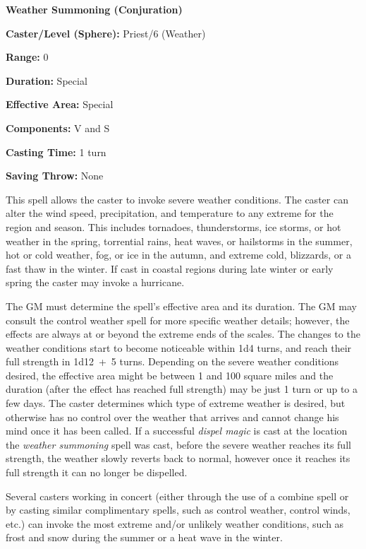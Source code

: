 \begin{multicols}{2}
\begin{minipage}{\columnwidth}
\noindent \textbf{Weather Summoning (Conjuration)}

\noindent \textbf{Caster/Level (Sphere):} Priest/6 (Weather)

\noindent \textbf{Range:} 0

\noindent \textbf{Duration:} Special

\noindent \textbf{Effective Area:} Special

\noindent \textbf{Components:} V and S

\noindent \textbf{Casting Time:} 1 turn

\noindent \textbf{Saving Throw:} None

\end{minipage}

This spell allows the caster to invoke severe weather conditions.  The caster can alter the wind speed, precipitation, and temperature to any extreme for the region and season.  This includes tornadoes, thunderstorms, ice storms, or hot weather in the spring, torrential rains, heat waves, or hailstorms in the summer, hot or cold weather, fog, or ice in the autumn, and extreme cold, blizzards, or a fast thaw in the winter.  If cast in coastal regions during late winter or early spring the caster may invoke a hurricane.

The GM must determine the spell's effective area and its duration.  The GM may consult the control weather spell for more specific weather details; however, the effects are always at or beyond the extreme ends of the scales.  The changes to the weather conditions start to become noticeable within 1d4 turns, and reach their full strength in 1d12~+~5 turns.  Depending on the severe weather conditions desired, the effective area might be between 1 and 100 square miles and the duration (after the effect has reached full strength) may be just 1 turn or up to a few days.  The caster determines which type of extreme weather is desired, but otherwise has no control over the weather that arrives and cannot change his mind once it has been called.  If a successful \textit{dispel magic} is cast at the location the \textit{weather summoning} spell was cast, before the severe weather reaches its full strength, the weather slowly reverts back to normal, however once it reaches its full strength it can no longer be dispelled.  

Several casters working in concert (either through the use of a combine spell or by casting similar complimentary spells, such as control weather, control winds, etc.) can invoke the most extreme and/or unlikely weather conditions, such as frost and snow during the summer or a heat wave in the winter.


\end{multicols}
